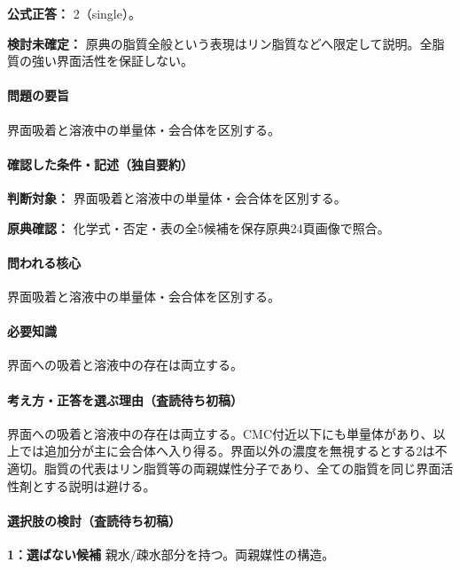 \textbf{公式正答：} 2（single）。

\par\textbf{検討未確定：} 原典の脂質全般という表現はリン脂質などへ限定して説明。全脂質の強い界面活性を保証しない。

\paragraph{問題の要旨} 界面吸着と溶液中の単量体・会合体を区別する。

\paragraph{確認した条件・記述（独自要約）}\mbox{}\par

\noindent\textbf{判断対象：} 界面吸着と溶液中の単量体・会合体を区別する。\par

\noindent\textbf{原典確認：} 化学式・否定・表の全5候補を保存原典24頁画像で照合。\par

\paragraph{問われる核心} 界面吸着と溶液中の単量体・会合体を区別する。

\paragraph{必要知識} 界面への吸着と溶液中の存在は両立する。

\paragraph{考え方・正答を選ぶ理由（査読待ち初稿）} 界面への吸着と溶液中の存在は両立する。CMC付近以下にも単量体があり、以上では追加分が主に会合体へ入り得る。界面以外の濃度を無視するとする2は不適切。脂質の代表はリン脂質等の両親媒性分子であり、全ての脂質を同じ界面活性剤とする説明は避ける。

\paragraph{選択肢の検討（査読待ち初稿）}\mbox{}\par

\noindent\textbf{1：選ばない候補} 親水/疎水部分を持つ。両親媒性の構造。\par

